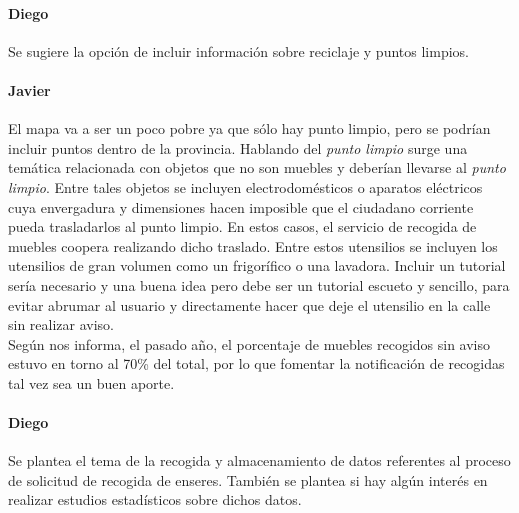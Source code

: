 \paragraph{Diego} Se sugiere la opción de incluir información sobre reciclaje y puntos limpios.
 
\paragraph{Javier} El mapa va a ser un poco pobre ya que sólo hay punto limpio, pero se podrían incluir puntos dentro de la provincia. Hablando del \textit{punto limpio} surge una temática relacionada con objetos que no son muebles y deberían llevarse al \textit{punto limpio}. Entre tales objetos se incluyen electrodomésticos o aparatos eléctricos cuya envergadura y dimensiones hacen imposible que el ciudadano corriente pueda trasladarlos al punto limpio. En estos casos, el servicio de recogida de muebles coopera realizando dicho traslado. Entre estos utensilios se incluyen los utensilios de gran volumen como un frigorífico o una lavadora.  Incluir un tutorial sería necesario y una buena idea pero debe ser un tutorial escueto y sencillo, para evitar abrumar al usuario y directamente hacer que deje el utensilio en la calle sin realizar aviso. \\ Según nos informa, el pasado año, el porcentaje de muebles recogidos sin aviso estuvo en torno al 70\% del total, por lo que fomentar la notificación de recogidas tal vez sea un buen aporte.
 
\paragraph{Diego} Se plantea el tema de la recogida y almacenamiento de datos referentes al proceso de solicitud de recogida de enseres. También se plantea si hay algún interés en realizar estudios estadísticos sobre dichos datos.
 
